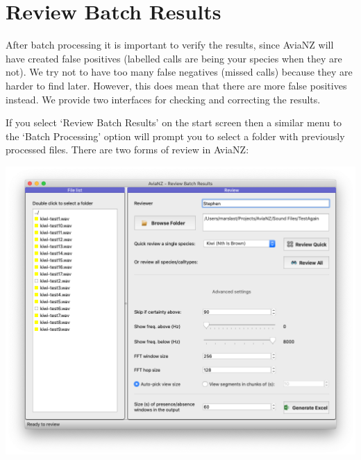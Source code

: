 \documentclass{article}
\begin{document}
\section{Review Batch Results}\label{sec:review}

After batch processing it is important to verify the results, since AviaNZ will have created false positives (labelled calls are being your species when they are not). We try not to have too many false negatives (missed calls) because they are harder to find later. However, this does mean that there are more false positives instead. We provide two interfaces for checking and correcting the results. 

If you select `Review Batch Results' on the start screen then a similar menu to the `Batch Processing' option will prompt you to select a folder with previously processed files. There are two forms of review in AviaNZ:
\begin{center}
	\includegraphics[width=.6\textwidth]{Figures/BatchReview1}
\end{center}
\end{document}
